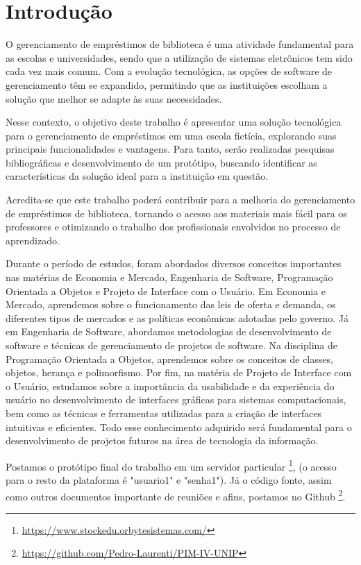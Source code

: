 \documentclass[
	12pt,				%
	openright,			%
	twoside,			%
	a4paper,			%
	english,			%
	french,				%
	spanish,			%
	brazil				%
	]{abntex2}
\begin{document}
\chapter{Introdução}

O gerenciamento de empréstimos de biblioteca é uma atividade fundamental para as escolas e universidades, sendo que a utilização de sistemas eletrônicos tem sido cada vez mais comum. Com a evolução tecnológica, as opções de software de gerenciamento têm se expandido, permitindo que as instituições escolham a solução que melhor se adapte às suas necessidades.

Nesse contexto, o objetivo deste trabalho é apresentar uma solução tecnológica para o gerenciamento de empréstimos em uma escola fictícia, explorando suas principais funcionalidades e vantagens. Para tanto, serão realizadas pesquisas bibliográficas e desenvolvimento de um protótipo, buscando identificar as características da solução ideal para a instituição em questão.

Acredita-se que este trabalho poderá contribuir para a melhoria do gerenciamento de empréstimos de biblioteca, tornando o acesso aos materiais mais fácil para os professores e otimizando o trabalho dos profissionais envolvidos no processo de aprendizado.

Durante o período de estudos, foram abordados diversos conceitos importantes nas matérias de Economia e Mercado, Engenharia de Software, Programação Orientada a Objetos e Projeto de Interface com o Usuário. Em Economia e Mercado, aprendemos sobre o funcionamento das leis de oferta e demanda, os diferentes tipos de mercados e as políticas econômicas adotadas pelo governo. Já em Engenharia de Software, abordamos metodologias de desenvolvimento de software e técnicas de gerenciamento de projetos de software. Na disciplina de Programação Orientada a Objetos, aprendemos sobre os conceitos de classes, objetos, herança e polimorfismo. Por fim, na matéria de Projeto de Interface com o Usuário, estudamos sobre a importância da usabilidade e da experiência do usuário no desenvolvimento de interfaces gráficas para sistemas computacionais, bem como as técnicas e ferramentas utilizadas para a criação de interfaces intuitivas e eficientes. Todo esse conhecimento adquirido será fundamental para o desenvolvimento de projetos futuros na área de tecnologia da informação.

Postamos o protótipo final do trabalho em um servidor particular \footnote{\url{https://www.stockedu.orbytesistemas.com/}}, (o acesso para o resto da plataforma é "usuario1" e "senha1"). Já o código fonte, assim como outros documentos importante de reuniões e afins, postamos no Github \footnote{\url{https://github.com/Pedro-Laurenti/PIM-IV-UNIP}}.
\end{document}
